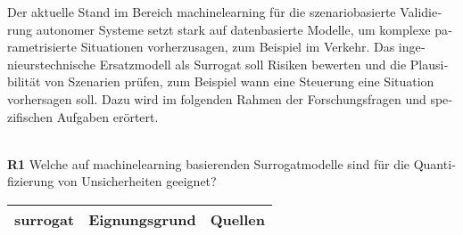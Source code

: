 


\begin{otherlanguage}{ngerman}


Der aktuelle Stand im Bereich \gls{machinelearning} für die szenariobasierte Validierung autonomer Systeme setzt stark auf datenbasierte Modelle, um komplexe parametrisierte Situationen vorherzusagen, zum Beispiel im Verkehr. Das ingenieurstechnische Ersatzmodell als Surrogat soll Risiken bewerten und die Plausibilität von Szenarien prüfen, zum Beispiel wann eine Steuerung eine Situation vorhersagen soll. Dazu wird im folgenden Rahmen der Forschungsfragen und spezifischen Aufgaben erörtert. \par\noindent\\


\textbf{R1} Welche auf \gls{machinelearning} basierenden Surrogatmodelle sind für die Quantifizierung von Unsicherheiten geeignet?

\begin{table}[!htpb]
  \centering
  \footnotesize
  \begin{tabularx}{\textwidth}{|l|X|X|}
    \hline
    \textbf{\gls{surrogat}} & \hspace{0.6em}\textbf{Eignungsgrund} & \hspace{0.6em}\textbf{Quellen} \\ \hline
    

\end{tabularx}
\end{table}
\end{otherlanguage}
